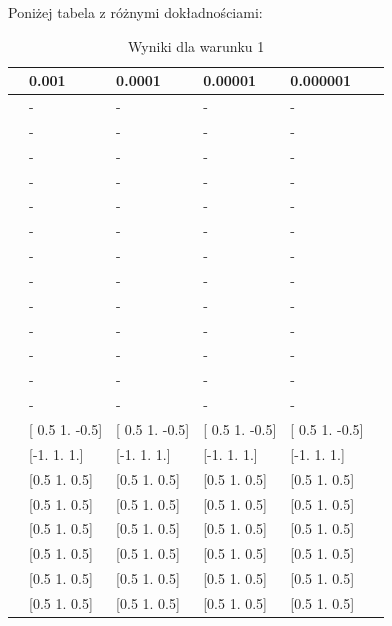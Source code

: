 \documentclass{article}
\begin{document}
Poniżej tabela z różnymi dokładnościami:

\begin{table}[H]
\centering
\begin{tabular}{|l|l|l|l|l|l|}
\hline
& 0.001 & 0.0001 & 0.00001 & 0.000001 \\ \hline
[-1.0, -1.0, -1.0] & - & - & - & - \\ \hline
[-0.9, -0.9, -0.9] & - & - & - & - \\ \hline
[-0.8, -0.8, -0.8] & - & - & - & - \\ \hline
[-0.7, -0.7, -0.7] & - & - & - & - \\ \hline
[-0.6, -0.6, -0.6] & - & - & - & - \\ \hline
[-0.5, -0.5, -0.5] & - & - & - & - \\ \hline
[-0.4, -0.4, -0.4] & - & - & - & - \\ \hline
[-0.3, -0.3, -0.3] & - & - & - & - \\ \hline
[-0.2, -0.2, -0.2] & - & - & - & - \\ \hline
[-0.1, -0.1, -0.1] & - & - & - & - \\ \hline
[-0.0, -0.0, -0.0] & - & - & - & - \\ \hline
[0.1, 0.1, 0.1] & - & - & - & - \\ \hline
[0.2, 0.2, 0.2] & - & - & - & - \\ \hline
[0.3, 0.3, 0.3] & [ 0.5  1.  -0.5] & [ 0.5  1.  -0.5] & [ 0.5  1.  -0.5] & [ 0.5  1.  -0.5] \\ \hline
[0.4, 0.4, 0.4] & [-1.  1.  1.] & [-1.  1.  1.] & [-1.  1.  1.] & [-1.  1.  1.] \\ \hline
[0.5, 0.5, 0.5] & [0.5 1.  0.5] & [0.5 1.  0.5] & [0.5 1.  0.5] & [0.5 1.  0.5] \\ \hline
[0.6, 0.6, 0.6] & [0.5 1.  0.5] & [0.5 1.  0.5] & [0.5 1.  0.5] & [0.5 1.  0.5] \\ \hline
[0.7, 0.7, 0.7] & [0.5 1.  0.5] & [0.5 1.  0.5] & [0.5 1.  0.5] & [0.5 1.  0.5] \\ \hline
[0.8, 0.8, 0.8] & [0.5 1.  0.5] & [0.5 1.  0.5] & [0.5 1.  0.5] & [0.5 1.  0.5] \\ \hline
[0.9, 0.9, 0.9] & [0.5 1.  0.5] & [0.5 1.  0.5] & [0.5 1.  0.5] & [0.5 1.  0.5] \\ \hline
[1.0, 1.0, 1.0] & [0.5 1.  0.5] & [0.5 1.  0.5] & [0.5 1.  0.5] & [0.5 1.  0.5] \\ \hline
\end{tabular}
\caption{Wyniki dla warunku 1}
\end{table}
\end{document}
